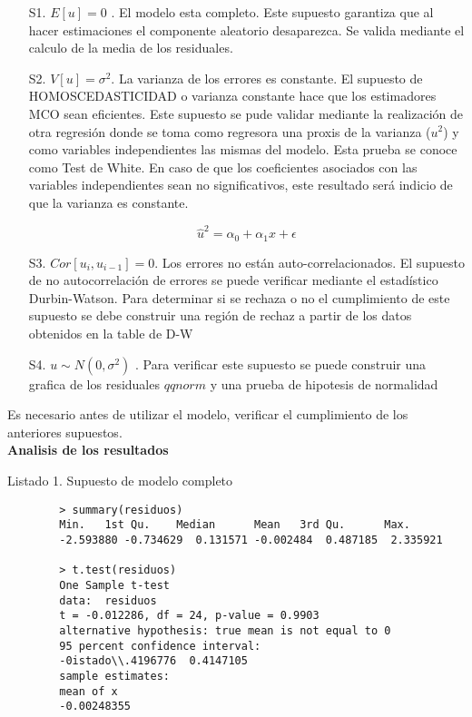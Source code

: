 \documentclass[base=hide,12pt]{elegantbook}
\begin{document}
	\begin{itemize}
		\item[S1.] $E[u]=0$ . El modelo esta completo. Este supuesto garantiza que al hacer estimaciones el componente aleatorio desaparezca. Se valida mediante el calculo de la media de los residuales.
		\item[S2.] $V[u]=\sigma^{2}$. La varianza de los errores es constante. El supuesto de HOMOSCEDASTICIDAD o varianza constante hace que los estimadores MCO sean eficientes. Este supuesto se pude validar mediante la realización de otra regresión donde se toma como regresora una proxis de la varianza ($u^{2}$) y como variables independientes las mismas del modelo. Esta prueba se conoce como Test de White. En caso de que los coeficientes asociados con las variables independientes sean no significativos, este resultado será indicio de que la varianza es constante.
		
			$$\widehat{u}^{2} = \alpha_{0} + \alpha_{1} x + \epsilon $$
		
		\item[S3.] $Cor[u_{i},u_{i-1}]=0$. Los errores no están auto-correlacionados. El supuesto de no autocorrelación de errores se puede verificar mediante el estadístico Durbin-Watson. Para determinar si se rechaza o no el cumplimiento de este supuesto se debe construir una región de rechaz a partir de los datos obtenidos en la table de D-W
		\item[S4.] $u \sim N(0, \sigma^{2})$ . Para verificar este supuesto se puede construir una grafica de los residuales $qqnorm$ y una prueba de hipotesis de normalidad
	\end{itemize}
	
	
	Es necesario antes de utilizar el modelo, verificar el cumplimiento de los anteriores supuestos.\\

\newpage		
		\textcolor{col4}{\Large \bf Analisis de los resultados} 
		
		Listado 1. Supuesto de modelo completo\\
		\begin{Box3}{}	
		\begin{verbatim}
		> summary(residuos)
		Min.   1st Qu.    Median      Mean   3rd Qu.      Max. 
		-2.593880 -0.734629  0.131571 -0.002484  0.487185  2.335921 
		
		> t.test(residuos)
		One Sample t-test
		data:  residuos
		t = -0.012286, df = 24, p-value = 0.9903
		alternative hypothesis: true mean is not equal to 0
		95 percent confidence interval:
		-0istado\\.4196776  0.4147105
		sample estimates:
		mean of x 
		-0.00248355  
		\end{verbatim}
	\end{Box3}
		
\end{document}
